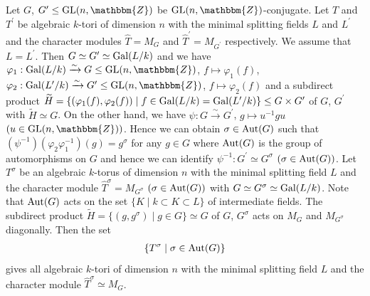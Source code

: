 \documentclass{amsart}
\theoremstyle{plain}
\theoremstyle{definition}
\theoremstyle{remark}
\newcommand{\bZ}{\mathbbm{Z}}\newcommand{\bQ}{\mathbbm{Q}}
\newcommand{\GL}{{\rm GL}}\newcommand{\SL}{{\rm SL}}
\newcounter{sub}\def\tr{\mbox{tr }}
\begin{document}
Let $G$, $G^\prime\leq {\rm GL}(n,\bZ)$ be $\GL(n,\bZ)$-conjugate. 
Let $T$ and $T^\prime$ %
be algebraic $k$-tori of dimension $n$ 
with the minimal splitting fields $L$ and $L^\prime$ 
and the character modules 
$\widehat{T}=M_G$ and $\widehat{T}^\prime=M_{G^\prime}$ 
respectively. 
%
We assume that $L=L^\prime$. 
Then $G\simeq G^\prime\simeq {\rm Gal}(L/k)$ and 
we have
$\varphi_1: {\rm Gal}(L/k)\xrightarrow{\sim} G\leq {\rm GL}(n,\bZ)$, 
$f\mapsto \varphi_1(f)$, 
$\varphi_2: {\rm Gal}(L^\prime/k)\xrightarrow{\sim} G^\prime\leq {\rm GL}(n,\bZ)$, 
$f\mapsto \varphi_2(f)$ and a subdirect product 
$\widetilde{H}=\{(\varphi_1(f),\varphi_2(f))\mid f\in {\rm Gal}(L/k)={\rm Gal}(L^\prime/k)\}\leq G\times G^\prime$ of $G$, $G^\prime$ with $\widetilde{H}\simeq G$. 
%
On the other hand, 
we have 
$\psi: G\xrightarrow{\sim} G^\prime$, $g\mapsto u^{-1}gu$ 
$(u\in {\rm GL}(n,\bZ))$. 
%
Hence we can obtain $\sigma\in {\rm Aut}(G)$ such that 
$(\psi^{-1})(\varphi_2\varphi_1^{-1})(g)=g^\sigma$ 
for any $g\in G$ where 
${\rm Aut}(G)$ is the group of automorphisms on $G$ and hence 
we can identify $\psi^{-1}:G^\prime\simeq G^\sigma$ $(\sigma\in {\rm Aut}(G))$. 
Let $T^\sigma$ be an algebraic $k$-torus of dimension $n$ 
with the minimal splitting field $L$ and the character module 
$\widehat{T}^\sigma=M_{G^\sigma}$ $(\sigma\in {\rm Aut}(G))$
with 
$G\simeq G^\sigma\simeq {\rm Gal}(L/k)$. 
Note that ${\rm Aut}(G)$ acts on the set $\{K\mid k\subset K\subset L\}$ 
of intermediate fields. 
The subdirect product 
$\widetilde{H}=\{(g,g^\sigma)\mid g\in G\}\simeq G$ 
of $G$, $G^\sigma$ acts on $M_G$ and $M_{G^\sigma}$ diagonally. 
Then the set 
\begin{align*}
\{T^\sigma\mid \sigma\in {\rm Aut}(G)\}
\end{align*}
gives all algebraic $k$-tori of dimension $n$ 
with the minimal splitting field $L$ and the character module 
$\widehat{T}^\sigma\simeq M_G$. 
\end{document}
